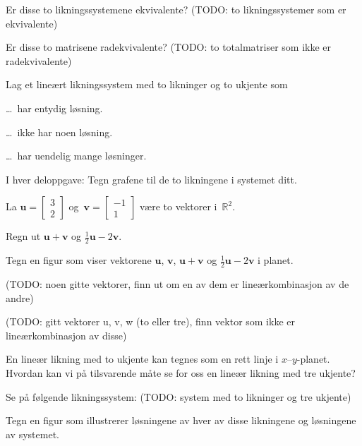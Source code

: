 \documentclass[11pt, a4paper, norsk]{NTNUoving}
\newcommand{\R}{\mathbb{R}}
\newcommand{\V}[1]{\mathbf{#1}}
\newcommand{\vv}[2]{\begin{bmatrix} #1 \\ #2 \end{bmatrix}}
\begin{document}
\begin{oppgave}
\begin{punkt}
Er disse to likningssystemene ekvivalente?
(TODO: to likningssystemer som er ekvivalente)
\end{punkt}
\begin{punkt}
Er disse to matrisene radekvivalente?
(TODO: to totalmatriser som ikke er radekvivalente)
\end{punkt}
\end{oppgave}


\begin{oppgave}
Lag et lineært likningssystem med to likninger og to ukjente som
\begin{punkt}
\ldots\ har entydig løsning.
\end{punkt}
\begin{punkt}
\ldots\ ikke har noen løsning.
\end{punkt}
\begin{punkt}
\ldots\ har uendelig mange løsninger.
\end{punkt}
I hver deloppgave: Tegn grafene til de to likningene i systemet ditt.
\end{oppgave}


\begin{oppgave}
La $\V{u} = \vv{3}{2}$ og~$\V{v} = \vv{-1}{1}$ være to vektorer
i~$\R^2$.

\begin{punkt}
Regn ut $\V{u} + \V{v}$ og $\frac{1}{2} \V{u} - 2 \V{v}$.
\end{punkt}

\begin{punkt}
Tegn en figur som viser vektorene $\V{u}$, $\V{v}$, $\V{u} + \V{v}$ og
$\frac{1}{2} \V{u} - 2 \V{v}$ i planet.
\end{punkt}
\end{oppgave}


\begin{oppgave}
(TODO: noen gitte vektorer, finn ut om en av dem er lineærkombinasjon av de andre)
\end{oppgave}


\begin{oppgave}
(TODO: gitt vektorer u, v, w (to eller tre), finn vektor som ikke er lineærkombinasjon av disse)
\end{oppgave}


\begin{oppgave}
\begin{punkt}
En lineær likning med to ukjente kan tegnes som en rett linje i $x$--$y$-planet.
Hvordan kan vi på tilsvarende måte se for oss en lineær likning med tre ukjente?
\end{punkt}
\begin{punkt}
Se på følgende likningssystem:
(TODO: system med to likninger og tre ukjente)

Tegn en figur som illustrerer løsningene av hver av disse likningene
og løsningene av systemet.
\end{punkt}
\end{oppgave}
\end{document}
